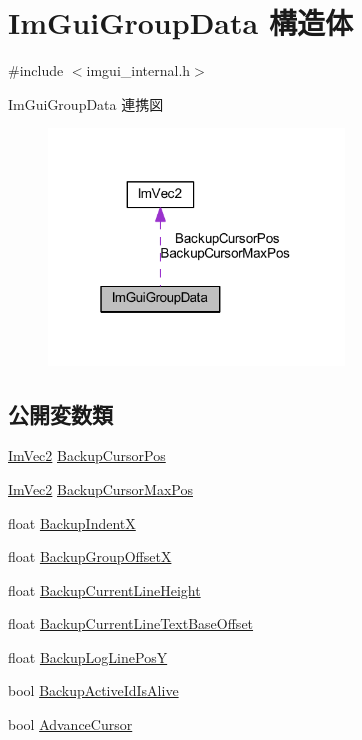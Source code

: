 \hypertarget{struct_im_gui_group_data}{}\section{Im\+Gui\+Group\+Data 構造体}
\label{struct_im_gui_group_data}


{\ttfamily \#include $<$imgui\+\_\+internal.\+h$>$}



Im\+Gui\+Group\+Data 連携図\nopagebreak
\begin{figure}[H]
\begin{center}
\leavevmode
\includegraphics[width=223pt]{struct_im_gui_group_data__coll__graph}
\end{center}
\end{figure}
\subsection*{公開変数類}
\begin{DoxyCompactItemize}
\item 
\mbox{\hyperlink{struct_im_vec2}{Im\+Vec2}} \mbox{\hyperlink{struct_im_gui_group_data_a8b29e2d9081876fd4847b1cd86c60500}{Backup\+Cursor\+Pos}}
\item 
\mbox{\hyperlink{struct_im_vec2}{Im\+Vec2}} \mbox{\hyperlink{struct_im_gui_group_data_abb83c4db050ef7d20485902cc14c4a0d}{Backup\+Cursor\+Max\+Pos}}
\item 
float \mbox{\hyperlink{struct_im_gui_group_data_a9d39092c1c154ba4809ae79e47baeb64}{Backup\+IndentX}}
\item 
float \mbox{\hyperlink{struct_im_gui_group_data_a0cee1b14b574a4bf883ceb1be58a9332}{Backup\+Group\+OffsetX}}
\item 
float \mbox{\hyperlink{struct_im_gui_group_data_a6e17deccf50138bdf436fa172bb453e2}{Backup\+Current\+Line\+Height}}
\item 
float \mbox{\hyperlink{struct_im_gui_group_data_a3745219bd1f4c6ee5080d8d0aaa8a712}{Backup\+Current\+Line\+Text\+Base\+Offset}}
\item 
float \mbox{\hyperlink{struct_im_gui_group_data_af67f52c70f74a3b7bce8ce46affc856b}{Backup\+Log\+Line\+PosY}}
\item 
bool \mbox{\hyperlink{struct_im_gui_group_data_ac27968bcfd94ba2e4b1543b95d032f35}{Backup\+Active\+Id\+Is\+Alive}}
\item 
bool \mbox{\hyperlink{struct_im_gui_group_data_a2bfc0ee6236ec2ace16634a34eda72d7}{Advance\+Cursor}}
\end{DoxyCompactItemize}


